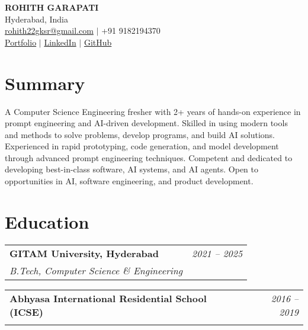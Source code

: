 \documentclass[11pt,a4paper]{article}
\makeatletter
\newcommand{\resumeSubHeading}[4]{
  \vspace{-2pt}\begin{tabular*}{\textwidth}{l@{\extracolsep{\fill}}r}
    \textbf{#1} & \textit{#2} \\
    \textit{\small#3} & \textit{\small#4} \\
  \end{tabular*}\vspace{-2pt}
}
\makeatother
\begin{document}
\begin{center}
    {\Huge \bfseries ROHITH GARAPATI} \\
    \vspace{3pt}
    Hyderabad, India \\
    \href{mailto:rohith22gksr@gmail.com}{rohith22gksr@gmail.com} $|$ +91 9182194370 \\
    \href{https://infinityone22.github.io/portfolio-website}{Portfolio} $|$
    \href{https://linkedin.com/in/rohith-garapati-649912160}{LinkedIn} $|$
    \href{https://github.com/INFINITYone22}{GitHub}
\end{center}

\section{Summary}
A Computer Science Engineering fresher with 2+ years of hands-on experience in prompt engineering and AI-driven development. Skilled in using modern tools and methods to solve problems, develop programs, and build AI solutions. Experienced in rapid prototyping, code generation, and model development through advanced prompt engineering techniques. Competent and dedicated to developing best-in-class software, AI systems, and AI agents. Open to opportunities in AI, software engineering, and product development.

\section{Education}
\resumeSubHeading{GITAM University, Hyderabad}{2021 -- 2025}{B.Tech, Computer Science \& Engineering}{}
\resumeSubHeading{Abhyasa International Residential School (ICSE)}{2016 -- 2019}{}{}


\end{document}

